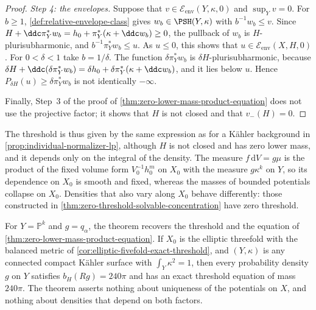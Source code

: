 \begin{proof}
\emph{Step 4: the envelopes.} Suppose that $v\in\mathcal E_{\mathrm{env}}(Y,\kappa,0)$ and $\sup_Yv=0$. For $b\geq1$, \cref{def:relative-envelope-class} gives $w_b\in\PSH(Y,\kappa)$ with $b^{-1}w_b\leq v$. Since $H+\ddc\pi_Y^*w_b=h_0+\pi_Y^*(\kappa+\ddc w_b)\geq0$, the pullback of $w_b$ is $H$-plurisubharmonic, and $b^{-1}\pi_Y^*w_b\leq u$. As $u\leq0$, this shows that $u\in\mathcal E_{\mathrm{env}}(X,H,0)$. For $0<\delta<1$ take $b=1/\delta$. The function $\delta\pi_Y^*w_b$ is $\delta H$-plurisubharmonic, because $\delta H+\ddc(\delta\pi_Y^*w_b)=\delta h_0+\delta\pi_Y^*(\kappa+\ddc w_b)$, and it lies below $u$. Hence $P_{\delta H}(u)\geq\delta\pi_Y^*w_b$ is not identically $-\infty$.

Finally, Step~3 of the proof of \cref{thm:zero-lower-mass-product-equation} does not use the projective factor; it shows that $H$ is not closed and that $v_-(H)=0$.
\end{proof}

The threshold is thus given by the same expression as for a K\"ahler background in \cref{prop:individual-normalizer-lp}, although $H$ is not closed and has zero lower mass, and it depends only on the integral of the density. The measure $f\,\mathrm{d}V=g\mu$ is the product of the fixed volume form $V_0^{-1}h_0^m$ on $X_0$ with the measure $g\kappa^k$ on $Y$, so its dependence on $X_0$ is smooth and fixed, whereas the masses of bounded potentials collapse on $X_0$. Densities that also vary along $X_0$ behave differently: those constructed in \cref{thm:zero-threshold-solvable-concentration} have zero threshold.

For $Y=\mathbb P^k$ and $g=q_\alpha$, the theorem recovers the threshold and the equation of \cref{thm:zero-lower-mass-product-equation}. If $X_0$ is the elliptic threefold with the balanced metric of \cref{cor:elliptic-fivefold-exact-threshold}, and $(Y,\kappa)$ is any connected compact K\"ahler surface with $\int_Y\kappa^2=1$, then every probability density $g$ on $Y$ satisfies $b_H(Rg)=240\pi$ and has an exact threshold equation of mass $240\pi$. The theorem asserts nothing about uniqueness of the potentials on $X$, and nothing about densities that depend on both factors.
